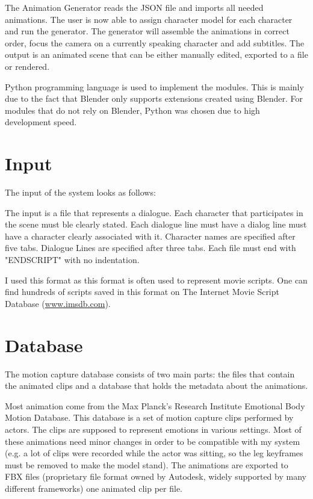 The Animation Generator reads the JSON file and imports all needed animations. The user is now able to assign character model for each character and run the generator. The generator will assemble the animations in correct order, focus the camera on a currently speaking character and add subtitles. The output is an animated scene that can be either manually edited, exported to a file or rendered.

Python programming language is used to implement the modules. This is mainly due to the fact that Blender only supports extensions created using Blender. For modules that do not rely on Blender, Python was chosen due to high development speed.


\section{Input}

The input of the system looks as follows:

The input is a file that represents a dialogue. Each character that participates in the scene must ble clearly stated. Each dialogue line must have a dialog line must have a character clearly associated with it. Character names are specified after five tabs. Dialogue Lines are specified after three tabs. Each file must end with "ENDSCRIPT" with no indentation.

I used this format as this format is often used to represent movie scripts. One can find hundreds of scripts saved in this format on The Internet Movie Script Database (\url{www.imsdb.com}).


\section{Database}

The motion capture database consists of two main parts: the files that contain the animated clips and a database that holds the metadata about the animations.

Most animation come from the Max Planck's Research Institute Emotional Body Motion Database. This database is a set of motion capture clips performed by actors. The clips are supposed to represent emotions in various settings. Most of these animations need minor changes in order to be compatible with my system (e.g. a lot of clips were recorded while the actor was sitting, so the leg keyframes must be removed to make the model stand). The animations are exported to FBX files (proprietary file format owned by Autodesk, widely supported by many different frameworks) one animated clip per file.

